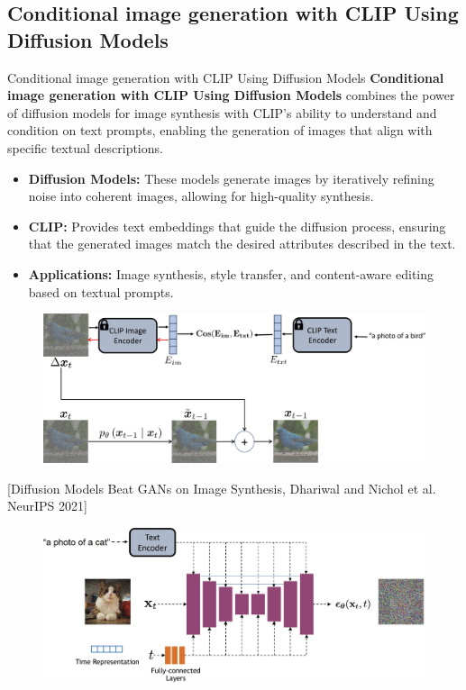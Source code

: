 \subsection{Conditional image generation with CLIP Using Diffusion Models}
\begin{frame}[allowframebreaks]{Conditional image generation with CLIP Using Diffusion Models}
    \textbf{Conditional image generation with CLIP Using Diffusion Models} combines the power of diffusion models for image synthesis with CLIP's ability to understand and condition on text prompts, enabling the generation of images that align with specific textual descriptions.

    \begin{itemize}
        \item \textbf{Diffusion Models:} These models generate images by iteratively refining noise into coherent images, allowing for high-quality synthesis.
        \item \textbf{CLIP:} Provides text embeddings that guide the diffusion process, ensuring that the generated images match the desired attributes described in the text.
        \item \textbf{Applications:} Image synthesis, style transfer, and content-aware editing based on textual prompts.
    \end{itemize}
\framebreak
    \begin{figure}
        \centering
        \includegraphics[width=1\textwidth,height=0.8\textheight,keepaspectratio]{images/video/slide_69_1_img.jpg}
    \end{figure}
    {\footnotesize{[Diffusion Models Beat GANs on Image Synthesis, Dhariwal and Nichol et al. NeurIPS 2021]}}
\framebreak
    \begin{figure}
        \centering
        \includegraphics[width=1\textwidth,height=0.9\textheight,keepaspectratio]{images/video/slide_70_1_img.jpg}
    \end{figure}
\end{frame}